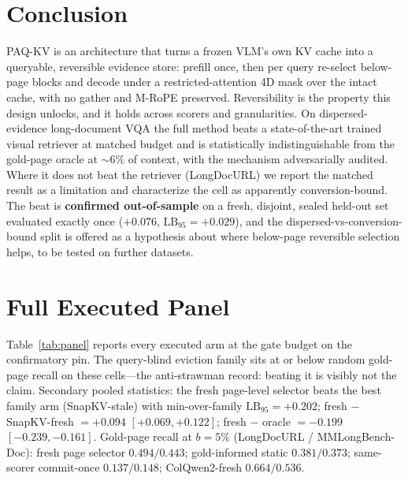 \documentclass[letterpaper]{article} %
\newcommand{\paqc}{\textsc{PAQ-KV}}
\newcommand{\lb}{\mathrm{LB}_{95}}
\begin{document}
\section{Conclusion}
\paqc{} is an architecture that turns a frozen VLM's own KV cache into a queryable, reversible evidence store: prefill once, then per query re-select below-page blocks and decode under a restricted-attention 4D mask over the intact cache, with no gather and M-RoPE preserved. Reversibility is the property this design unlocks, and it holds across scorers and granularities. On dispersed-evidence long-document VQA the full method beats a state-of-the-art trained visual retriever at matched budget and is statistically indistinguishable from the gold-page oracle at ${\sim}6\%$ of context, with the mechanism adversarially audited. Where it does not beat the retriever (LongDocURL) we report the matched result as a limitation and characterize the cell as apparently conversion-bound. The beat is \textbf{confirmed out-of-sample} on a fresh, disjoint, sealed held-out set evaluated exactly once ($+0.076$, $\lb=+0.029$), and the dispersed-vs-conversion-bound split is offered as a hypothesis about where below-page reversible selection helps, to be tested on further datasets.



\appendix

\section{Full Executed Panel}\label{app:panel}

Table~\ref{tab:panel} reports every executed arm at the gate budget on the confirmatory pin. The query-blind eviction family sits at or below random gold-page recall on these cells---the anti-strawman record: beating it is visibly not the claim. Secondary pooled statistics: the fresh page-level selector beats the best family arm (SnapKV-stale) with min-over-family $\lb = +0.202$; fresh $-$ SnapKV-fresh $= +0.094$ $[+0.069,+0.122]$; fresh $-$ oracle $= -0.199$ $[-0.239,-0.161]$. Gold-page recall at $b{=}5\%$ (LongDocURL / MMLongBench-Doc): fresh page selector $0.494/0.443$; gold-informed static $0.381/0.373$; same-scorer commit-once $0.137/0.148$; ColQwen2-fresh $0.664/0.536$.
\end{document}
